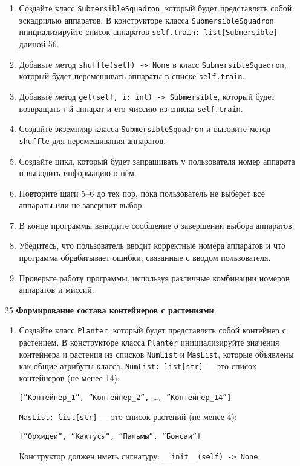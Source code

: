 \begin{enumerate}
\begin{enumerate}
    \item Создайте класс \texttt{SubmersibleSquadron}, который будет представлять собой эскадрилью аппаратов. В конструкторе класса \texttt{SubmersibleSquadron} инициализируйте список аппаратов \texttt{self.train: list[Submersible]} длиной 56.

    \item Добавьте метод \texttt{shuffle(self) -> None} в класс \texttt{SubmersibleSquadron}, который будет перемешивать аппараты в списке \texttt{self.train}.

    \item Добавьте метод \texttt{get(self, i: int) -> Submersible}, который будет возвращать $i$-й аппарат и его миссию из списка \texttt{self.train}.

    \item Создайте экземпляр класса \texttt{SubmersibleSquadron} и вызовите метод \texttt{shuffle} для перемешивания аппаратов.

    \item Создайте цикл, который будет запрашивать у пользователя номер аппарата и выводить информацию о нём.

    \item Повторите шаги 5–6 до тех пор, пока пользователь не выберет все аппараты или не завершит выбор.

    \item В конце программы выводите сообщение о завершении выбора аппаратов.

    \item Убедитесь, что пользователь вводит корректные номера аппаратов и что программа обрабатывает ошибки, связанные с вводом пользователя.

    \item Проверьте работу программы, используя различные комбинации номеров аппаратов и миссий.
\end{enumerate}

\item[25] \textbf{Формирование состава контейнеров с растениями}
\begin{enumerate}
    \item Создайте класс \texttt{Planter}, который будет представлять собой контейнер с растением. В конструкторе класса \texttt{Planter} инициализируйте значения контейнера и растения из списков \texttt{NumList} и \texttt{MasList}, которые объявлены как общие атрибуты класса. \texttt{NumList: list[str]} — это список контейнеров (не менее 14): 
    \begin{center}
        \texttt{[''Контейнер\_1'', ''Контейнер\_2'', \dots, ''Контейнер\_14'']}
    \end{center}
    \texttt{MasList: list[str]} — это список растений (не менее 4):
    \begin{center}
        \texttt{[''Орхидеи'', ''Кактусы'', ''Пальмы'', ''Бонсаи'']}
    \end{center}
    Конструктор должен иметь сигнатуру: \texttt{\_\_init\_\_(self) -> None}.


\end{enumerate}
\end{enumerate}
